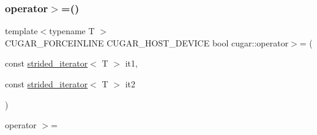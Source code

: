 \subsubsection{\texorpdfstring{operator$>$=()}{operator>=()}}
{\footnotesize\ttfamily template$<$typename T $>$ \\
C\+U\+G\+A\+R\+\_\+\+F\+O\+R\+C\+E\+I\+N\+L\+I\+NE C\+U\+G\+A\+R\+\_\+\+H\+O\+S\+T\+\_\+\+D\+E\+V\+I\+CE bool cugar\+::operator$>$= (\begin{DoxyParamCaption}\item[{const \hyperlink{structcugar_1_1strided__iterator}{strided\+\_\+iterator}$<$ T $>$}]{it1,  }\item[{const \hyperlink{structcugar_1_1strided__iterator}{strided\+\_\+iterator}$<$ T $>$}]{it2 }\end{DoxyParamCaption})}

operator $>$= 